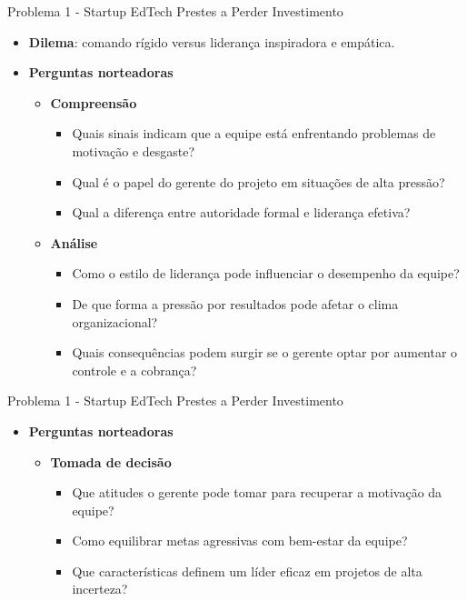 \documentclass{beamer}
\begin{document}
\begin{frame}{Problema 1 - Startup EdTech Prestes a Perder Investimento}
	\begin{itemize}
		\justifying
		\item \textbf{Dilema}: comando rígido versus liderança inspiradora e empática.
		\item \textbf{Perguntas norteadoras}
		\begin{itemize}
			\item \textbf{Compreensão}
				\begin{itemize}
					\justifying
					\item Quais sinais indicam que a equipe está enfrentando problemas de motivação e desgaste?
					\item Qual é o papel do gerente do projeto em situações de alta pressão?
					\item Qual a diferença entre autoridade formal e liderança efetiva?
				\end{itemize}
			\item \textbf{Análise}
				\begin{itemize}
					\justifying
					\item Como o estilo de liderança pode influenciar o desempenho da equipe?
					\item De que forma a pressão por resultados pode afetar o clima organizacional?
					\item Quais consequências podem surgir se o gerente optar por aumentar o controle e a cobrança?
				\end{itemize}
		\end{itemize}
	\end{itemize}
\end{frame}

\begin{frame}{Problema 1 - Startup EdTech Prestes a Perder Investimento}
	\begin{itemize}
		\justifying
		\item \textbf{Perguntas norteadoras}
		\begin{itemize}
			\item \textbf{Tomada de decisão}
				\begin{itemize}
					\justifying
					\item Que atitudes o gerente pode tomar para recuperar a motivação da equipe?
					\item Como equilibrar metas agressivas com bem-estar da equipe?
					\item Que características definem um líder eficaz em projetos de alta incerteza?
				\end{itemize}
		\end{itemize}
	\end{itemize}
\end{frame}
\end{document}
